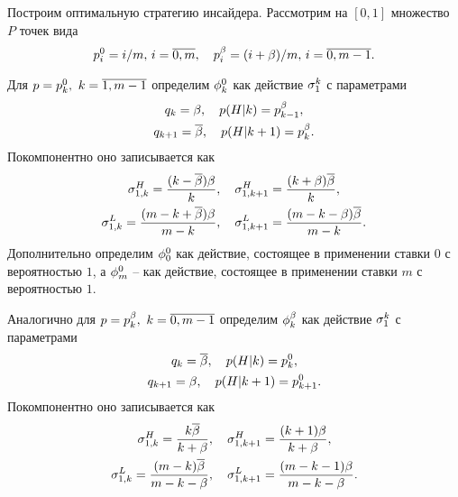 {Построим оптимальную стратегию инсайдера. Рассмотрим на $[0,1]$ множество $P$ точек вида
\[
\pEven[i] = i/m, \, i = \overline{0, m}, \quad \pOdd[i] = (i + \Co)/m, \, i =
\overline{0, m - 1}.
\]

Для $p = \pEven,\ k = \overline{1, m-1}$ определим $\fEven$ как действие $\fGeneral{k}$ с параметрами
\begin{gather*}
  q_k = \Co, \quad p(H|k) = \pOdd[k-1],\\
  q_{k+1} = \DCo, \quad p(H|k + 1) = \pOdd[k].
\end{gather*}
Покомпонентно оно записывается как
\begin{gather*}
  \fGeneral[1,k]{H} = \frac{(k-\DCo)\Co}{k},\quad 
  \fGeneral[1,k+1]{H} = \frac{(k+\Co)\DCo}{k},\\
  \fGeneral[1,k]{L} = \frac{(m - k + \DCo)\Co}{m - k},\quad 
  \fGeneral[1,k+1]{L} = \frac{(m - k - \Co)\DCo}{m - k}.
\end{gather*}
Дополнительно определим $\fEven[0]$ как действие, состоящее в применении ставки $0$ с вероятностью $1$, а $\fEven[m]$ -- как действие, состоящее в применении ставки $m$ с вероятностью $1$.

Аналогично для $p = \pOdd,\ k = \overline{0, m-1}$ определим $\fOdd$ как действие $\fGeneral{k}$ с параметрами
\begin{gather*}
  q_k = \DCo, \quad p(H|k) = \pEven[k],\\
  q_{k+1} = \Co, \quad p(H|k + 1) = \pEven[k+1].
\end{gather*}
Покомпонентно оно записывается как
\begin{gather*}
  \fGeneral[1,k]{H} = \frac{k\DCo}{k + \Co},\quad 
  \fGeneral[1,k+1]{H} = \frac{(k+1)\Co}{k + \Co},\\
  \fGeneral[1,k]{L} = \frac{(m - k)\DCo}{m - k - \Co},\quad 
  \fGeneral[1,k+1]{L} = \frac{(m - k - 1)\Co}{m - k - \Co}.
\end{gather*}

}
